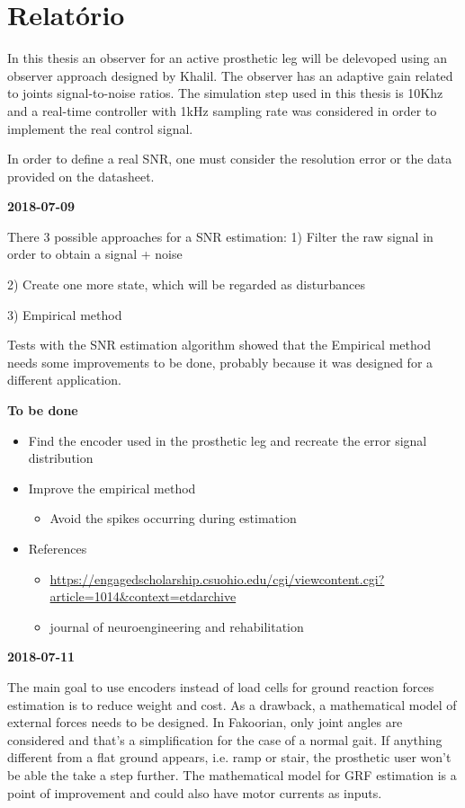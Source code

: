\chapter{Relatório}

In this thesis an observer for an active prosthetic leg will be delevoped using an observer approach designed by Khalil. 
The observer has an adaptive gain related to joints signal-to-noise ratios.
The simulation step used in this thesis is 10Khz and a real-time controller with 1kHz sampling rate was considered in order to 
implement the real control signal.

In order to define a real SNR, one must consider the resolution error or the data provided on the datasheet.

\textbf{2018-07-09}


There 3 possible approaches for a SNR estimation:
1) Filter the raw signal in order to obtain a signal + noise

2) Create one more state, which will be regarded as disturbances

3) Empirical method

Tests with the SNR estimation algorithm showed that the Empirical method needs some improvements to be done, probably 
because it was designed for a different application.


\textbf{To be done}
\begin{itemize}
    \item Find the encoder used in the prosthetic leg and recreate the error signal distribution
    \item Improve the empirical method
    \begin{itemize}
        \item Avoid the spikes occurring during estimation
    \end{itemize}
    \item References
    \begin{itemize}
        \item \url{https://engagedscholarship.csuohio.edu/cgi/viewcontent.cgi?article=1014&context=etdarchive}
        \item journal of neuroengineering and rehabilitation
    \end{itemize}
\end{itemize}

\textbf{2018-07-11}

The main goal to use encoders instead of load cells for ground reaction forces estimation is to reduce weight and cost. 
As a drawback, a mathematical model of external forces needs to be designed. In Fakoorian, only joint angles are considered and that's a simplification 
for the case of a normal gait. If anything different from a flat ground appears, i.e. ramp or stair, the prosthetic 
user won't be able the take a step further.  The mathematical model for GRF estimation is a point of improvement and could also have motor currents as inputs.

